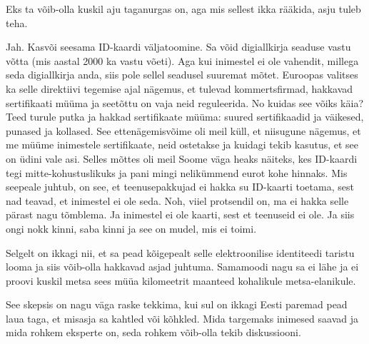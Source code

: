 
Eks ta võib-olla kuskil aju taganurgas on, aga mis sellest ikka rääkida, asju tuleb teha. 


Jah. Kasvõi seesama ID-kaardi väljatoomine.  Sa võid digiallkirja seaduse vastu võtta (mis aastal 2000 ka vastu võeti). Aga  kui inimestel ei ole vahendit, millega seda digiallkirja anda, siis pole sellel seadusel suuremat mõtet. Euroopas valitses ka selle direktiivi tegemise ajal nägemus, et  tulevad kommertsfirmad, hakkavad  sertifikaati müüma ja seetõttu on vaja neid reguleerida. No kuidas see võiks käia? Teed turule putka ja hakkad sertifikaate müüma: suured sertifikaadid ja väikesed, punased ja kollased. See ettenägemisvõime oli meil küll, et niisugune nägemus, et me müüme inimestele sertifikaate, neid ostetakse ja kuidagi tekib kasutus, et see on üdini vale asi. Selles mõttes oli meil Soome väga heaks näiteks, kes ID-kaardi tegi mitte-kohustuslikuks ja pani mingi nelikümmend eurot kohe  hinnaks. Mis seepeale juhtub, on see, et teenusepakkujad ei hakka su ID-kaarti toetama, sest nad teavad, et inimestel ei ole seda. Noh, viiel protsendil on, ma ei hakka selle pärast nagu tõmblema.  Ja inimestel ei ole kaarti, sest  et teenuseid ei ole. Ja siis ongi nokk kinni, saba kinni ja see on mudel, mis ei toimi. 

Selgelt on ikkagi nii, et sa pead kõigepealt selle  elektroonilise identiteedi taristu looma ja siis võib-olla hakkavad asjad juhtuma.  Samamoodi nagu sa ei lähe ja ei proovi kuskil metsa sees müüa kilomeetrit maanteed  kohalikule metsa-elanikule. 


See skepsis on nagu väga raske tekkima, kui sul on ikkagi Eesti paremad pead laua taga, et misasja sa kahtled või kõhkled. Mida targemaks inimesed saavad ja mida rohkem eksperte on, seda rohkem võib-olla tekib diskussiooni. 


